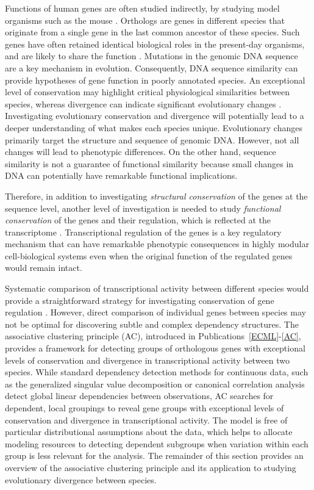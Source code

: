 
Functions of human genes are often studied indirectly, by studying
model organisms such as the mouse \citep{Davis04, Joyce06}. Orthologs
are genes in different species that originate from a single gene in
the last common ancestor of these species. Such genes have often
retained identical biological roles in the present-day organisms, and
are likely to share the function \citep{Fitch70}. Mutations in the
genomic DNA sequence are a key mechanism in evolution. Consequently,
DNA sequence similarity can provide hypotheses of gene function in
poorly annotated species. An exceptional level of conservation may
highlight critical physiological similarities between species, whereas
divergence can indicate significant evolutionary changes
\citep{Jordan05}. Investigating evolutionary conservation and
divergence will potentially lead to a deeper understanding of what
makes each species unique.  Evolutionary changes primarily target the
structure and sequence of genomic DNA. However, not all changes will
lead to phenotypic differences.  On the other hand, sequence
similarity is not a guarantee of functional similarity because small
changes in DNA can potentially have remarkable functional
implications.

Therefore, in addition to investigating {\it structural conservation}
of the genes at the sequence level, another level of investigation is
needed to study {\it functional conservation} of the genes and their
regulation, which is reflected at the transcriptome \citep{Jimenez02,
  Jordan05}. Transcriptional regulation of the genes is a key
regulatory mechanism that can have remarkable phenotypic consequences
in highly modular cell-biological systems \citep{Hartwell99} even when
the original function of the regulated genes would remain intact.

Systematic comparison of transcriptional activity between different
species would provide a straightforward strategy for investigating
conservation of gene regulation \citep{Bergmann04, Enard02, Zhou04}.
However, direct comparison of individual genes between species may not
be optimal for discovering subtle and complex dependency structures.
The associative clustering principle (AC), introduced in
Publications~\ref{ECML}-\ref{AC}, provides a framework for detecting
groups of orthologous genes with exceptional levels of conservation
and divergence in transcriptional activity between two species. While
standard dependency detection methods for continuous data, such as the
generalized singular value decomposition \citep[see e.g.][]{Alter03}
or canonical correlation analysis \citep{Hotelling36} detect global
linear dependencies between observations, AC searches for dependent,
local groupings to reveal gene groups with exceptional levels of
conservation and divergence in transcriptional activity.  The model is
free of particular distributional assumptions about the data, which
helps to allocate modeling resources to detecting dependent subgroups
when variation within each group is less relevant for the analysis.
The remainder of this section provides an overview of the associative
clustering principle and its application to studying evolutionary
divergence between species.

